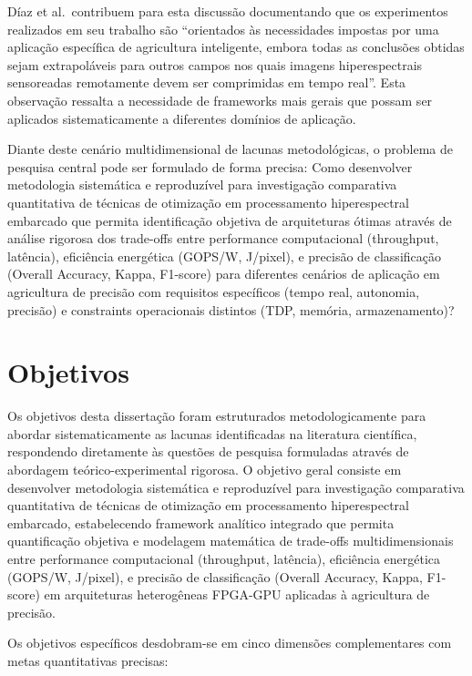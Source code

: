 Díaz et al.\ contribuem para esta discussão documentando que os experimentos 
realizados em seu trabalho são ``orientados às necessidades impostas por uma 
aplicação específica de agricultura inteligente, embora todas as conclusões 
obtidas sejam extrapoláveis para outros campos nos quais imagens 
hiperespectrais sensoreadas remotamente devem ser comprimidas em tempo real''. 
Esta observação ressalta a necessidade de frameworks mais 
gerais que possam ser aplicados sistematicamente a diferentes domínios de 
aplicação.

Diante deste cenário multidimensional de lacunas metodológicas, o problema 
de pesquisa central pode ser formulado de forma precisa: Como desenvolver 
metodologia sistemática e reproduzível para investigação comparativa 
quantitativa de técnicas de otimização em processamento hiperespectral 
embarcado que permita identificação objetiva de arquiteturas ótimas através 
de análise rigorosa dos trade-offs entre performance computacional (throughput, 
latência), eficiência energética (GOPS/W, J/pixel), e precisão de classificação 
(Overall Accuracy, Kappa, F1-score) para diferentes cenários de aplicação 
em agricultura de precisão com requisitos específicos (tempo real, autonomia, 
precisão) e constraints operacionais distintos (TDP, memória, armazenamento)?

\section{Objetivos}\label{sec:objetivos}

Os objetivos desta dissertação foram estruturados metodologicamente para 
abordar sistematicamente as lacunas identificadas na literatura científica, 
respondendo diretamente às questões de pesquisa formuladas através de 
abordagem teórico-experimental rigorosa. O objetivo geral consiste em 
desenvolver metodologia sistemática e reproduzível para investigação 
comparativa quantitativa de técnicas de otimização em processamento 
hiperespectral embarcado, estabelecendo framework analítico integrado 
que permita quantificação objetiva e modelagem matemática de trade-offs 
multidimensionais entre performance computacional (throughput, latência), 
eficiência energética (GOPS/W, J/pixel), e precisão de classificação 
(Overall Accuracy, Kappa, F1-score) em arquiteturas heterogêneas FPGA-GPU 
aplicadas à agricultura de precisão.

Os objetivos específicos desdobram-se em cinco dimensões complementares 
com metas quantitativas precisas:

